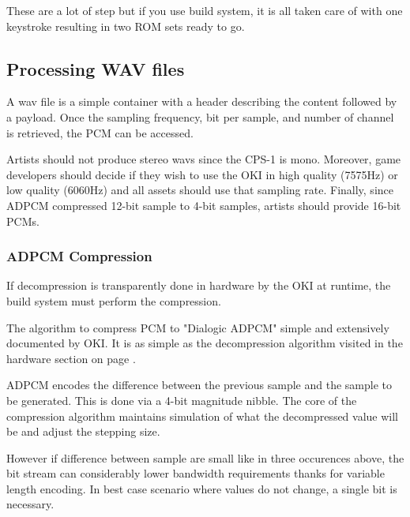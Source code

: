 \begin{trivia}
These are a lot of step but if you use  build system, it is all taken care of with one keystroke resulting in two ROM sets ready to go.
\end{trivia}

\subsection{Processing WAV files}
A wav file is a simple container with a header describing the content followed by a payload. Once the sampling frequency, bit per sample, and number of channel is retrieved, the PCM can be accessed.

Artists should not produce stereo wavs since the CPS-1 is mono. Moreover, game developers should decide if they wish to use the OKI in high quality (7575Hz) or low quality (6060Hz) and all assets should use that sampling rate. Finally, since ADPCM compressed 12-bit sample to 4-bit samples, artists should provide 16-bit PCMs.


\subsubsection{ADPCM Compression}
If decompression is transparently done in hardware by the OKI at runtime, the build system must perform the compression. 

The algorithm to compress PCM to "Dialogic ADPCM" simple and extensively documented by OKI\cite{adpcm_specs}. It is as simple as the decompression algorithm visited in the hardware section on page \pageref{adpcm_decompression_label}.

ADPCM encodes the difference between the previous sample and the sample to be generated. This is done via a 4-bit magnitude nibble. The core of the compression algorithm maintains simulation of what the decompressed value will be and adjust the stepping size.




However if difference between sample are small like in three occurences above, the bit stream can considerably lower bandwidth requirements thanks for variable length encoding. In best case scenario where values do not change, a single bit is necessary.



